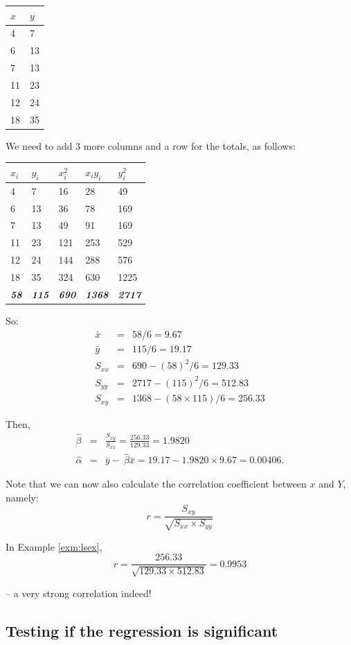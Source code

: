 \documentclass[12pt,a4paper,openany,twoside]{report}
\renewcommand{\emph}[1]{\textcolor{Emerald}{\textit{#1}}}
\theoremstyle{definition}
\theoremstyle{remark}
\theoremstyle{plain}
\newcommand{\vsps}{\vspace{.5cm}}
\theoremstyle{definition}
\theoremstyle{definition}
\theoremstyle{definition}
\theoremstyle{remark}
\begin{document}
\begin{longtable}[c]{@{}ll@{}}
\toprule
$x$ & $y$\tabularnewline
\midrule
\endhead
4 & 7\tabularnewline
6 & 13\tabularnewline
7 & 13\tabularnewline
11 & 23\tabularnewline
12 & 24\tabularnewline
18 & 35\tabularnewline
\bottomrule
\end{longtable}
\vsps

We need to add 3 more columns and a row for the totals, as follows:\newline

\begin{longtable}[c]{@{}lllll@{}}
\toprule
$x_i$ & $y_i$ &
$x_i^2$ & $x_iy_i$ &
$y_i^2$ \tabularnewline
\midrule
\endhead
4 & 7 & 16 & 28 & 49\tabularnewline
6 & 13 & 36 & 78 & 169\tabularnewline
7 & 13 & 49 & 91 & 169\tabularnewline
11 & 23 & 121 & 253 & 529\tabularnewline
12 & 24 & 144 & 288 & 576\tabularnewline
18 & 35 & 324 & 630 & 1225\tabularnewline
\bottomrule
\emph{\textbf{58}} & \emph{\textbf{115}} & \emph{\textbf{690}} &
\emph{\textbf{1368}} & \emph{\textbf{2717}}\tabularnewline
\end{longtable}

So:
\begin{eqnarray*} 
\bar{x} &=& 58/6 = 9.67\\
\bar{y} &=& 115/6 = 19.17\\
S_{xx} &=& 690 - (58)^{2}/6 = 129.33 \\
S_{yy} &=& 2717 - (115)^{2}/6 = 512.83 \\
S_{xy} &=& 1368 - (58\times115)/6 = 256.33 
\end{eqnarray*}

Then,
\begin{eqnarray*} 
\hat{\beta} &=&  \frac{S_{xy}}{S_{xx}} = \frac{256.33}{129.33} =  1.9820\\
\hat{\alpha} &=&  \bar{y} - \ \hat{\beta}\bar{x} = 19.17 - 1.9820\times9.67 = 0.00406. 
\end{eqnarray*}

Note that we can now also calculate the correlation coefficient between \(x\) and \(Y\), namely:
\begin{equation}
r = \frac{S_{xy}}{\sqrt{S_{xx}\times S_{yy}}}
\end{equation}

In Example \ref{exm:lsex},
\[r = \frac{256.33}{\sqrt{129.33\times512.83}} = 0.9953\]

-- a very strong correlation indeed!

\hypertarget{testreg}{%
\subsection{Testing if the regression is significant}\label{testreg}}
\end{document}
